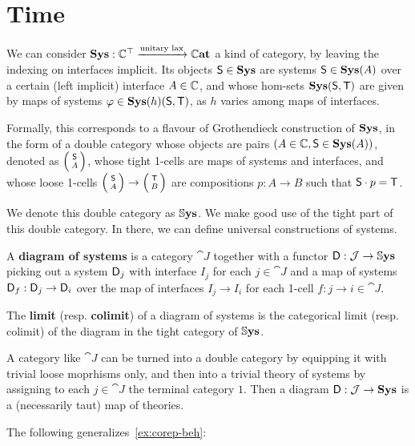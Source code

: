\section{Time}
We can consider $\Sys : \theoryover{\Comp}$ a kind of category, by leaving the indexing on interfaces implicit.
Its objects $\mathsf{S} \in {\mathbf{Sys}}$ are systems $\mathsf{S} \in {\mathbf{Sys}}(A)$ over a certain (left implicit) interface $A \in \Comp$, and whose hom-sets ${\mathbf{Sys}}(\mathsf{S}, \mathsf{T})$ are given by maps of systems $\varphi \in {\mathbf{Sys}}(h)(\mathsf{S}, \mathsf{T})$, as $h$ varies among maps of interfaces.

Formally, this corresponds to a flavour of Grothendieck construction of ${\mathbf{Sys}}$, in the form of a double category whose objects are pairs $(A \in \Comp, \sys S \in \Sys(A))$, denoted as $\lens{\sys S}{A}$, whose tight 1-cells are maps of systems and interfaces, and whose loose 1-cells $\lens{\sys S}{A} \to \lens{\sys T}{B}$ are compositions $p:A \to B$ such that $\mathsf{S}\cdot p = \mathsf{T}$.

We denote this double category as $\dblSys$.
We make good use of the tight part of this double category.
In there, we can define universal constructions of systems.

\begin{definition}
	A \textbf{diagram of systems} is a category $\cat J$ together with a functor $\sys D : \cat J \to \dblSys$ picking out a system $\mathsf{D}_j$ with interface $I_j$ for each $j \in \cat J$ and a map of systems $\mathsf{D}_f : \mathsf{D}_j \to \mathsf{D}_i$ over the map of interfaces $I_j \to I_i$ for each 1-cell $f:j \to i \in \cat J$.
\end{definition}

\begin{definition}
	The \textbf{limit} (resp. \textbf{colimit}) of a diagram of systems is the categorical limit (resp. colimit) of the diagram in the tight category of $\dblSys$.
\end{definition}


\begin{remark}
	A category like $\cat J$ can be turned into a double category by equipping it with trivial loose moprhisms only, and then into a trivial theory of systems by assigning to each $j \in \cat J$ the terminal category $1$.
	Then a diagram $\sys D : \cat J \to \Sys$ is a (necessarily taut) map of theories.
\end{remark}

The following generalizes~\cref{ex:corep-beh}:

